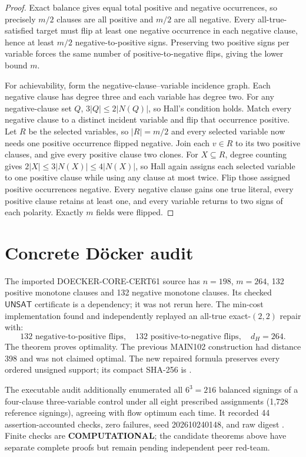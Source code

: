 \documentclass[11pt]{article}
\newcommand{\UNSAT}{\mathsf{UNSAT}}
\begin{document}
\begin{proof}
Exact balance gives equal total positive and negative occurrences, so precisely $m/2$
clauses are all positive and $m/2$ are all negative.  Every all-true-satisfied target must
flip at least one negative occurrence in each negative clause, hence at least $m/2$
negative-to-positive signs.  Preserving two positive signs per variable forces the same
number of positive-to-negative flips, giving the lower bound $m$.

For achievability, form the negative-clause--variable incidence graph.  Each negative
clause has degree three and each variable has degree two.  For any negative-clause set
$Q$, $3|Q|\le2|N(Q)|$, so Hall's condition holds.  Match every negative clause to a
distinct incident variable and flip that occurrence positive.  Let $R$ be the selected
variables, so $|R|=m/2$ and every selected variable now needs one positive occurrence
flipped negative.  Join each $v\in R$ to its two positive clauses, and give every positive
clause two clones.  For $X\subseteq R$, degree counting gives
$2|X|\le3|N(X)|\le4|N(X)|$, so Hall again assigns each selected variable to one positive
clause while using any clause at most twice.  Flip those assigned positive occurrences
negative.  Every negative clause gains one true literal, every positive clause retains at
least one, and every variable returns to two signs of each polarity.  Exactly $m$ fields
were flipped.
\end{proof}

\section{Concrete D\"ocker audit}

The imported DOECKER-CORE-CERT61 source has $n=198$, $m=264$, 132 positive monotone
clauses and 132 negative monotone clauses.  Its checked $\UNSAT$ certificate is a dependency;
it was not rerun here.  The min-cost implementation found and independently replayed an
all-true exact-$(2,2)$ repair with:
\[
132\text{ negative-to-positive flips},\quad
132\text{ positive-to-negative flips},\quad
d_H=264.
\]
The theorem proves optimality.  The previous MAIN102 construction had distance 398 and was
not claimed optimal.  The new repaired formula preserves every ordered unsigned support;
its compact SHA-256 is
.

The executable audit additionally enumerated all $6^3=216$ balanced signings of a
four-clause three-variable control under all eight prescribed assignments (1,728 reference
signings), agreeing with flow optimum each time.  It recorded 44 assertion-accounted checks,
zero failures, seed 202610240148, and raw digest
.
Finite checks are \textbf{COMPUTATIONAL}; the candidate theorems above have separate
complete proofs but remain pending independent peer red-team.
\end{document}
